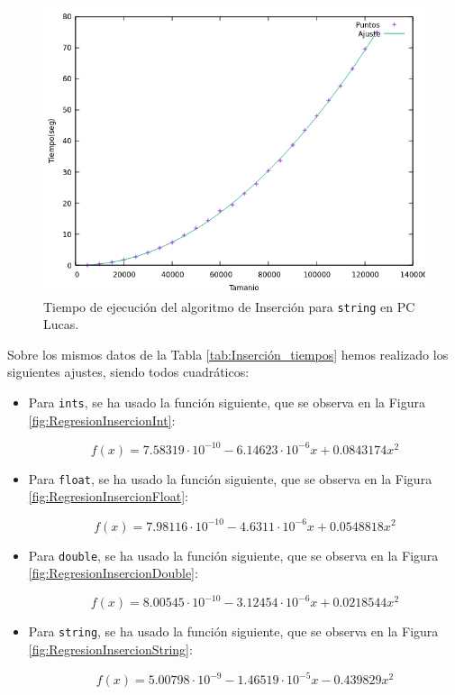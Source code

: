 \documentclass[12pt]{article}
\begin{document}
    \begin{figure}
        \centering
        \includegraphics[width=0.8\linewidth]{images/Insercion/insercion_string_graf.png}
        \cprotect\caption{Tiempo de ejecución del algoritmo de Inserción para \verb|string| en PC Lucas.}
        \label{fig:Inserción_string_graf}
    \end{figure}

    Sobre los mismos datos de la Tabla \ref{tab:Inserción_tiempos} hemos realizado los siguientes ajustes, siendo todos cuadráticos:
    \begin{itemize}
        \item Para \verb|ints|, se ha usado la función siguiente, que se observa en la Figura \ref{fig:RegresionInsercionInt}:

        $$f(x)=7.58319\cdot10^{-10}-6.14623\cdot10^{-6}x+0.0843174x^2$$
    
        \item Para \verb|float|, se ha usado la función siguiente, que se observa en la Figura \ref{fig:RegresionInsercionFloat}:
    
        $$f(x)=7.98116\cdot10^{-10}-4.6311\cdot10^{-6}x+0.0548818x^2$$
    
        \item Para \verb|double|, se ha usado la función siguiente, que se observa en la Figura \ref{fig:RegresionInsercionDouble}:
    
        $$f(x)=8.00545\cdot10^{-10}-3.12454\cdot10^{-6}x+0.0218544x^2$$
    
        \item Para \verb|string|, se ha usado la función siguiente, que se observa en la Figura \ref{fig:RegresionInsercionString}:
    
        $$f(x)=5.00798\cdot10^{-9}-1.46519\cdot10^{-5}x-0.439829x^2$$
    \end{itemize}
\end{document}
